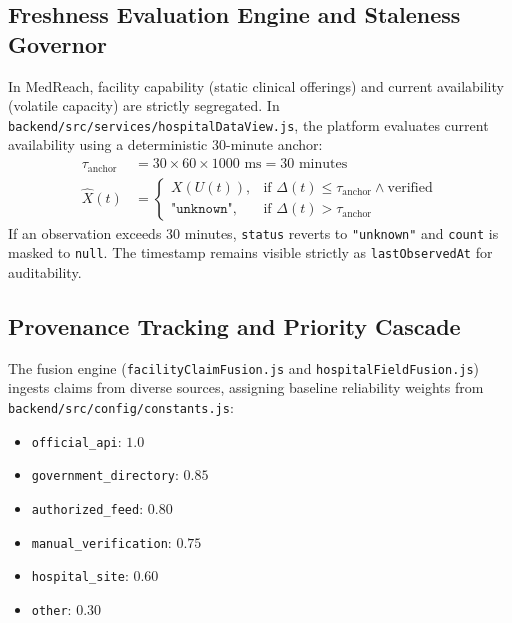 \documentclass[conference]{IEEEtran}
\begin{document}
\subsection{Freshness Evaluation Engine and Staleness Governor}
In MedReach, facility capability (static clinical offerings) and current availability (volatile capacity) are strictly segregated. In \texttt{backend/src/services/hospitalDataView.js}, the platform evaluates current availability using a deterministic 30-minute anchor:
\begin{align}
\tau_{\text{anchor}} &= 30 \times 60 \times 1000\text{ ms} = 30\text{ minutes} \\
\hat{X}(t) &= 
\begin{cases} 
X(U(t)), & \text{if } \Delta(t) \le \tau_{\text{anchor}} \land \text{verified} \\
\texttt{"unknown"}, & \text{if } \Delta(t) > \tau_{\text{anchor}}
\end{cases}
\end{align}
If an observation exceeds 30 minutes, \texttt{status} reverts to \texttt{"unknown"} and \texttt{count} is masked to \texttt{null}. The timestamp remains visible strictly as \texttt{lastObservedAt} for auditability.

\subsection{Provenance Tracking and Priority Cascade}
The fusion engine (\texttt{facilityClaimFusion.js} and \texttt{hospitalFieldFusion.js}) ingests claims from diverse sources, assigning baseline reliability weights from \texttt{backend/src/config/constants.js}:
\begin{itemize}
    \item \texttt{official\_api}: $1.0$
    \item \texttt{government\_directory}: $0.85$
    \item \texttt{authorized\_feed}: $0.80$
    \item \texttt{manual\_verification}: $0.75$
    \item \texttt{hospital\_site}: $0.60$
    \item \texttt{other}: $0.30$
\end{itemize}
\end{document}

